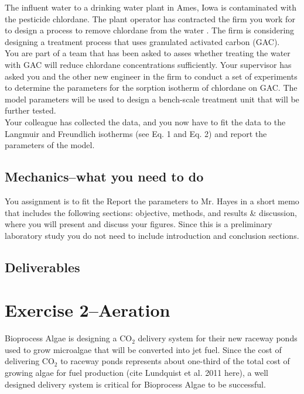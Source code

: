 \documentclass[12pt,letterpaper]{article}
\begin{document}
The influent water to a drinking water plant in Ames, Iowa is contaminated with the pesticide chlordane.  The plant operator has contracted the firm you work for to design a  process to remove chlordane from the water . The firm is considering designing a treatment process that uses granulated activated carbon (GAC).\\

You are part of a team that has been asked to asses whether treating the water with GAC will reduce chlordane concentrations sufficiently. Your supervisor has asked you and the other new engineer in the firm to conduct a set of experiments to determine the parameters for the sorption isotherm of chlordane on GAC.  The model  parameters will be used to design a bench-scale treatment unit that will be further tested.\\

Your colleague has collected the data, and you now have to fit the data to the Langmuir and Freundlich isotherms (see Eq. 1 and Eq. 2) and report the parameters of the model.  

\subsection *{Mechanics--what you need to do}


You assignment is to fit the   
Report the parameters to Mr. Hayes in a short memo that includes the following sections: objective, methods, and results \& discussion, where you will present and discuss your figures. Since this is a preliminary laboratory study you do not need to include introduction and conclusion sections.

\subsection *{Deliverables}


\section *{Exercise 2--Aeration}

Bioprocess Algae is designing a CO$_2$ delivery system for their new raceway ponds used to grow microalgae that will be converted into jet fuel. Since the cost of delivering CO$_2$ to raceway ponds represents about one-third of the total cost of growing algae for fuel production (cite Lundquist et al. 2011 here), a well designed delivery system is critical for Bioprocess Algae to be successful. 
\end{document}
